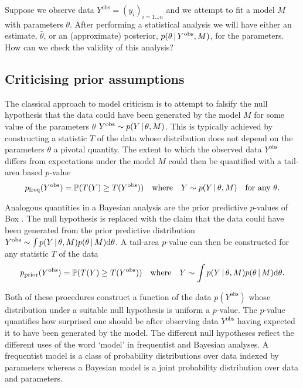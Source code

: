 Suppose we observe data $Y^\textrm{obs} = (y_i)_{i=1\ldots n}$ and we attempt to fit a model $M$ with parameters $\theta$.
After performing a statistical analysis we will have either an estimate, $\hat\theta$, or an (approximate) posterior, $p(\theta \,|\, Y^\textrm{obs}, M)$, for the parameters.
How can we check the validity of this analysis?

\subsection{Criticising prior assumptions}

The classical approach to model criticism is to attempt to falsify the null hypothesis that the data could have been generated by the model $M$ for some value of the parameters $\theta$ \ie ${Y^\textrm{obs} \sim p(Y \,|\, \theta, M)}$.
This is typically achieved by constructing a statistic $T$ of the data whose distribution does not depend on the parameters $\theta$ \ie a pivotal quantity.
The extent to which the observed data $Y^\textrm{obs}$ differs from expectations under the model $M$ could then be quantified with a tail-area based $p$-value
\begin{equation}
  p_\textrm{freq}(Y^\textrm{obs}) = \mathbb{P}(T(Y)\geq T(Y^\textrm{obs})) \quad \textrm{where} \quad Y \sim p(Y \,|\, \theta, M) \quad \textrm{for any } \theta.
  \label{eq:freq-p-value}
\end{equation}

Analogous quantities in a Bayesian analysis are the prior predictive $p$-values of Box \citep{Box1980-ud}.
The null hypothesis is replaced with the claim that the data could have been generated from the prior predictive distribution ${Y^\textrm{obs} \sim \int p(Y \,|\, \theta, M)p(\theta \,|\, M) \mathrm{d}\theta}$.
A tail-area $p$-value can then be constructed for any statistic $T$ of the data
\begin{equation}
  p_\textrm{prior}(Y^\textrm{obs}) = \mathbb{P}(T(Y)\geq T(Y^\textrm{obs})) \quad \textrm{where} \quad Y \sim \int p(Y \,|\, \theta, M)p(\theta \,|\, M) \mathrm{d}\theta.
  \label{eq:prior-p-value}
\end{equation}

Both of these procedures construct a function of the data $p(Y^\textrm{obs})$ whose distribution under a suitable null hypothesis is uniform \ie a $p$-value.
The $p$-value quantifies how surprised one should be after observing data $Y^\textrm{obs}$ having expected it to have been generated by the model.
The different null hypotheses reflect the different uses of the word `model' in frequentist and Bayesian analyses.
A frequentist model is a class of probability distributions over data indexed by parameters whereas a Bayesian model is a joint probability distribution over data and parameters.

